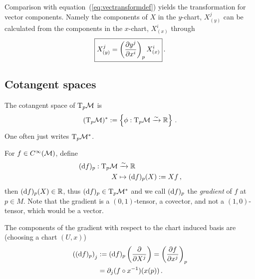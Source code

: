 \documentclass[11pt, a4paper, twocolumn]{article} %
\begin{document}
Comparison with equation~(\ref{eq:vectransformdef}) yields the transformation for vector components.
Namely the components of $X$ in the $y$-chart, $X^{j}_{(y)}$ can be calculated from the components
in the $x$-chart, $X^i_{(x)}$ through
\begin{equation}
    \boxed{%
    X^j_{(y)} = \left( \frac{\partial y^j}{\partial x^i} \right)_p X^{i}_{(x)}
}\,.
\end{equation}

\subsection{Cotangent spaces}
The cotangent space of $\T_p\M$ is
\begin{equation}
    (\T_p\M)^* := \left\{ \phi: \T_p\M \linearto \mathbb{R} \right\}\,.
\end{equation}
One often just writes $\T_p\M^*$.
\begin{exmp}[Gradient]
    For $f\in C^\infty(\mathcal{M})$, define 
    \begin{align}
        (\diff f)_p: \T_p\M &\linearto \mathbb{R}\nonumber\\
        X &\mapsto (\diff f)_p(X) := Xf\,,
    \end{align}
    then $(\operatorname{d\!} f)_p(X) \in \mathbb{R}$, thus
    $(\diff f)_p \in \T_p\M^*$ and we call $(\operatorname{d\!} f)_p$ the \textit{gradient} of $f$ at $p\in M$. 
    Note that the gradient is a $(0,1)$-tensor, a covector, and not a $(1,0)$-tensor,
    which would be a vector.

    The components of the gradient with respect to the chart induced basis are
    (choosing a chart $(U, x)$)
    \begin{align}
        \left( (\operatorname{d\!} f)_p \right)_j &:= (\operatorname{d\!} f)_p\left( \frac{\partial}{\partial X^j} \right)
        = \left( \frac{\partial f}{\partial x^j} \right)_p\\
        &= \partial_j (f\circ x^{-1})(x(p))\,.
    \end{align}
\end{exmp}
\end{document}
